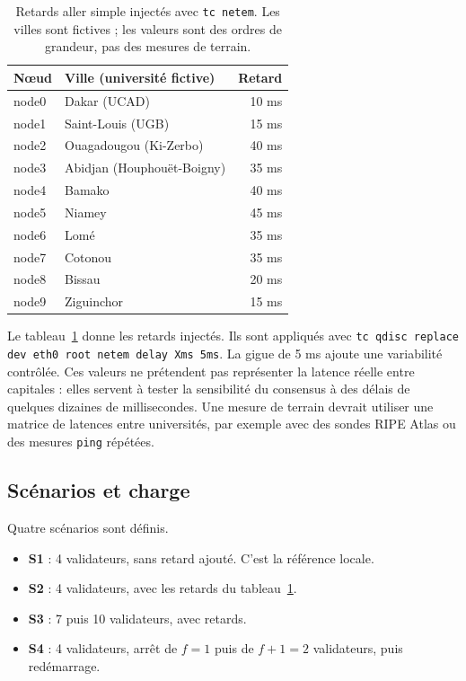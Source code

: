 \documentclass[conference]{IEEEtran}
\begin{document}
\begin{table}[t]
\caption{Retards aller simple injectés avec \texttt{tc netem}. Les villes sont fictives ; les valeurs sont des ordres de grandeur, pas des mesures de terrain.}
\label{tab:latences}
\centering
\footnotesize
\begin{tabular}{@{}llr@{}}
\toprule
Nœud & Ville (université fictive) & Retard \\
\midrule
node0 & Dakar (UCAD) & 10 ms \\
node1 & Saint-Louis (UGB) & 15 ms \\
node2 & Ouagadougou (Ki-Zerbo) & 40 ms \\
node3 & Abidjan (Houphouët-Boigny) & 35 ms \\
node4 & Bamako & 40 ms \\
node5 & Niamey & 45 ms \\
node6 & Lomé & 35 ms \\
node7 & Cotonou & 35 ms \\
node8 & Bissau & 20 ms \\
node9 & Ziguinchor & 15 ms \\
\bottomrule
\end{tabular}
\end{table}

Le tableau~\ref{tab:latences} donne les retards injectés. Ils sont appliqués avec \texttt{tc qdisc replace dev eth0 root netem delay Xms 5ms}. La gigue de 5 ms ajoute une variabilité contrôlée. Ces valeurs ne prétendent pas représenter la latence réelle entre capitales : elles servent à tester la sensibilité du consensus à des délais de quelques dizaines de millisecondes. Une mesure de terrain devrait utiliser une matrice de latences entre universités, par exemple avec des sondes RIPE Atlas ou des mesures \texttt{ping} répétées.

\subsection{Scénarios et charge}

Quatre scénarios sont définis.

\begin{itemize}
\item \textbf{S1} : 4 validateurs, sans retard ajouté. C'est la référence locale.
\item \textbf{S2} : 4 validateurs, avec les retards du tableau~\ref{tab:latences}.
\item \textbf{S3} : 7 puis 10 validateurs, avec retards.
\item \textbf{S4} : 4 validateurs, arrêt de $f=1$ puis de $f+1=2$ validateurs, puis redémarrage.
\end{itemize}
\end{document}
